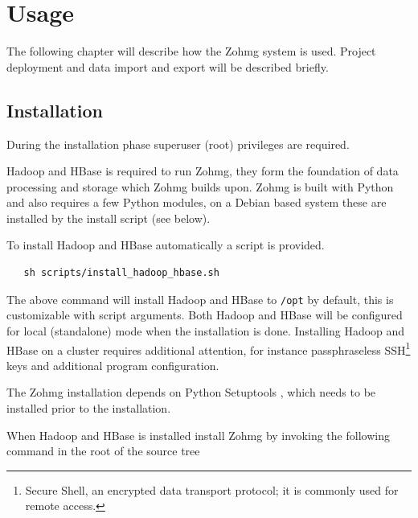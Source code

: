 \pagebreak



 



\appendix



\chapter{Usage}


\noindent The following chapter will describe how the Zohmg system is used.
Project deployment and data import and export will be described briefly.


\section*{Installation}

During the installation phase superuser (root) privileges are required.

Hadoop and HBase is required to run Zohmg, they form the foundation of data
processing and storage which Zohmg builds upon. Zohmg is built with Python and
also requires a few Python modules, on a Debian based system these are installed
by the install script (see below).

To install Hadoop and HBase automatically a script is provided.

\begin{verbatim}
   sh scripts/install_hadoop_hbase.sh
\end{verbatim}

The above command will install Hadoop and HBase to \texttt{/opt} by default,
this is customizable with script arguments. Both Hadoop and HBase will be
configured for local (standalone) mode when the installation is done. Installing
Hadoop and HBase on a cluster requires additional attention, for
instance passphraseless SSH\footnote{Secure Shell, an encrypted data transport
protocol; it is commonly used for remote access.} keys and additional program
configuration.

The Zohmg installation depends on Python Setuptools \cite{setuptools}, which
needs to be installed prior to the installation.

When Hadoop and HBase is installed install Zohmg by invoking the following
command in the root of the source tree

